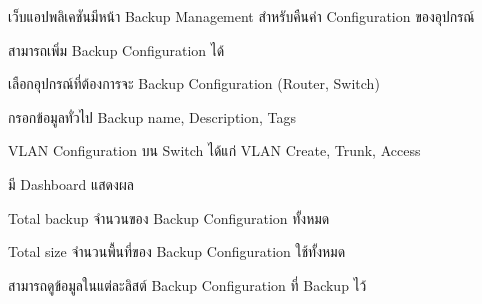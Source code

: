\begin{mycustomenum2}
    \item เว็บแอปพลิเคชันมีหน้า Backup Management สำหรับคืนค่า Configuration ของอุปกรณ์
    \begin{mycustomenum2}
        \item สามารถเพิ่ม Backup Configuration ได้
            \begin{mycustomenum2}
                \item เลือกอุปกรณ์ที่ต้องการจะ Backup Configuration (Router, Switch)
                \item กรอกข้อมูลทั่วไป Backup name, Description, Tags
                \item VLAN Configuration บน Switch ได้แก่ VLAN Create, Trunk, Access 
            \end{mycustomenum2} 
        \item มี Dashboard แสดงผล
            \begin{mycustomenum2}
                \item Total backup จำนวนของ Backup Configuration ทั้งหมด
                \item Total size จำนวนพื้นที่ของ Backup Configuration ใช้ทั้งหมด
            \end{mycustomenum2} 
        \item สามารถดูข้อมูลในแต่ละลิสต์ Backup Configuration ที่ Backup ไว้ 
    \end{mycustomenum2}
    
\end{mycustomenum2}

